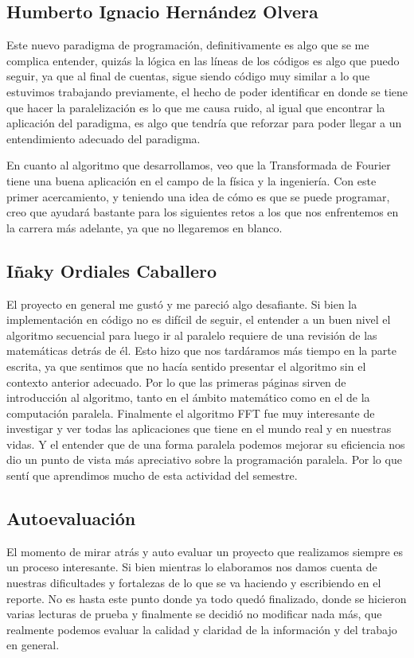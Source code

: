 \documentclass{report}
\begin{document}
\subsection*{Humberto Ignacio Hernández Olvera}
Este nuevo paradigma de programación, definitivamente es algo que se me complica entender, quizás la lógica en las líneas de los códigos es algo que puedo seguir, ya que al final de cuentas, sigue siendo código muy similar a lo que estuvimos trabajando previamente, el hecho de poder identificar en donde se tiene que hacer la paralelización es lo que me causa ruido, al igual que encontrar la aplicación del paradigma, es algo que tendría que reforzar para poder llegar a un entendimiento adecuado del paradigma.\medskip

En cuanto al algoritmo que desarrollamos, veo que la Transformada de Fourier tiene una buena aplicación en el campo de la física y la ingeniería. Con este primer acercamiento, y teniendo una idea de cómo es que se puede programar, creo que ayudará bastante para los siguientes retos a los que nos enfrentemos en la carrera más adelante, ya que no llegaremos en blanco.\medskip

\subsection*{Iñaky Ordiales Caballero}
El proyecto en general me gustó y me pareció algo desafiante. Si bien la implementación en código no es difícil de seguir, el entender a un buen nivel el algoritmo secuencial para luego ir al paralelo requiere de una revisión de las matemáticas detrás de él. Esto hizo que nos tardáramos más tiempo en la parte escrita, ya que sentimos que no hacía sentido presentar el algoritmo sin el contexto anterior adecuado. Por lo que las primeras páginas sirven de introducción al algoritmo, tanto en el ámbito matemático como en el de la computación paralela. Finalmente el algoritmo FFT fue muy interesante de investigar y ver todas las aplicaciones que tiene en el mundo real y en nuestras vidas. Y el entender que de una forma paralela podemos mejorar su eficiencia nos dio un punto de vista más apreciativo sobre la programación paralela. Por lo que sentí que aprendimos mucho de esta actividad del semestre.

\clearpage

\subsection*{Autoevaluación}
El momento de mirar atrás y auto evaluar un proyecto que realizamos siempre es un proceso interesante. Si bien mientras lo elaboramos nos damos cuenta de nuestras dificultades y fortalezas de lo que se va haciendo y escribiendo en el reporte. No es hasta este punto donde ya todo quedó finalizado, donde se hicieron varias lecturas de prueba y finalmente se decidió no modificar nada más, que realmente podemos evaluar la calidad y claridad de la información y del trabajo en general.\medskip
\end{document}
